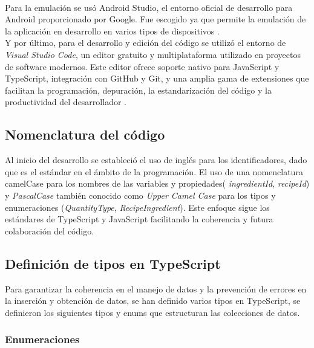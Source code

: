 \documentclass[12pt,a4paper]{report} %
\begin{document}
	\\
	Para la emulación se usó Android Studio, el entorno oficial de desarrollo para Android proporcionado por Google. Fue escogido ya que permite la emulación de la aplicación en desarrollo en varios tipos de dispositivos \cite{androidstudio2025}.
	\\
	Y por último, para el desarrollo y edición del código se utilizó el entorno de \textit{Visual Studio Code}, un editor gratuito y multiplataforma utilizado en proyectos de software modernos. Este editor ofrece soporte nativo para JavaScript y TypeScript, integración con GitHub y Git, y una amplia gama de extensiones que facilitan la programación, depuración, la estandarización del código y la productividad del desarrollador \cite{vscode2025}.
	\\
	
	
	\subsection*{Nomenclatura del código}{
			Al inicio del desarrollo se estableció el uso de inglés para los identificadores, dado que es el estándar en el ámbito de la programación. El uso de una nomenclatura camelCase\cite{camelCase} para los nombres de las variables y propiedades( \textit{ingredientId}, \textit{recipeId}) y \textit{PascalCase} también conocido como \textit{Upper Camel Case}\cite{PascalCase} para los tipos y enumeraciones (\textit{QuantityType}, \textit{RecipeIngredient}). Este enfoque sigue los estándares de TypeScript y JavaScript facilitando la coherencia y futura colaboración del código.
			
}
	
	
	\subsection*{Definición de tipos en TypeScript}
	
	Para garantizar la coherencia en el manejo de datos y la prevención de errores en la inserción y obtención de datos, se han definido varios tipos en TypeScript, se definieron los siguientes tipos y enums que estructuran las colecciones de datos.
	
	\subsubsection*{Enumeraciones}
	\label{Enums}
	
	
\end{document}
